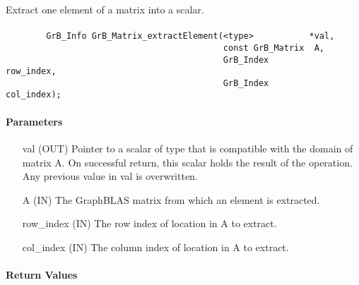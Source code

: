
Extract one element of a matrix into a scalar. 

\paragraph{\syntax}

\begin{verbatim}
        GrB_Info GrB_Matrix_extractElement(<type>           *val,
                                           const GrB_Matrix  A,
                                           GrB_Index         row_index,
                                           GrB_Index         col_index); 

\end{verbatim}

\paragraph{Parameters}

\begin{itemize}[leftmargin=1in]
    \item[{\sf val}]   ({\sf OUT}) Pointer to a scalar of type that is 
    compatible with the domain of matrix {\sf A}. On successful return, this scalar 
    holds the result of the operation.  Any previous value in {\sf val} is 
    overwritten.

    \item[{\sf A}]     ({\sf IN}) The GraphBLAS matrix from which an element is
    extracted.
    
    \item[{\sf row\_index}] ({\sf IN}) The row index of location in {\sf A} 
    to extract.

    \item[{\sf col\_index}] ({\sf IN}) The column index of location in {\sf A} 
    to extract.
\end{itemize}

\paragraph{Return Values}

